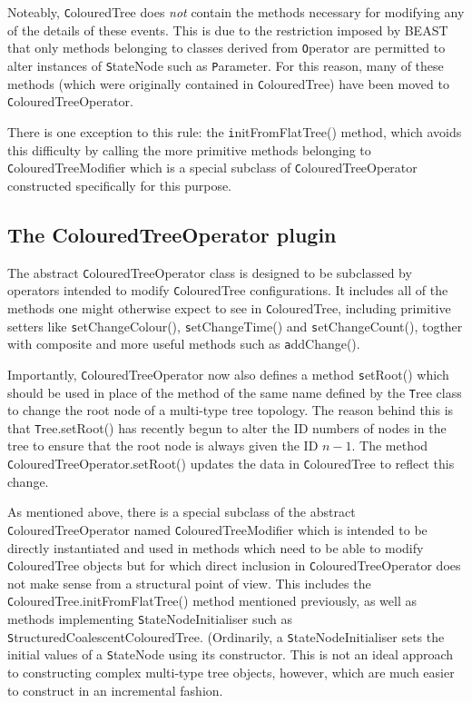 \documentclass[a4paper,11pt]{article}
\newcommand{\class}[1]{{\texttt #1}}
\newcommand{\method}[1]{{\texttt #1}}
\begin{document}
Noteably, \class{ColouredTree} does \emph{not} contain the methods
necessary for modifying any of the details of these events.  This is
due to the restriction imposed by BEAST that only methods belonging to
classes derived from \class{Operator} are permitted to alter instances
of \class{StateNode} such as \class{Parameter}.  For this reason,
many of these methods (which were originally contained in
\class{ColouredTree}) have been moved to \class{ColouredTreeOperator}.

There is one exception to this rule: the \method{initFromFlatTree()}
method, which avoids this difficulty by calling the more primitive
methods belonging to \class{ColouredTreeModifier} which is a special
subclass of \class{ColouredTreeOperator} constructed specifically for
this purpose.

\subsection{The ColouredTreeOperator plugin}

The abstract \class{ColouredTreeOperator} class is designed to be
subclassed by operators intended to modify \class{ColouredTree}
configurations.  It includes all of the methods one might otherwise
expect to see in \class{ColouredTree}, including primitive setters
like \method{setChangeColour()}, \method{setChangeTime()} and
\method{setChangeCount()}, togther with composite and more useful
methods such as \method{addChange()}.

Importantly, \class{ColouredTreeOperator} now also defines a method
\method{setRoot()} which should be used in place of the method of the
same name defined by the \class{Tree} class to change the root node of
a multi-type tree topology.  The reason behind this is that
\class{Tree.setRoot()} has recently begun to alter the ID numbers of
nodes in the tree to ensure that the root node is always given the ID
$n-1$.  The method \class{ColouredTreeOperator.setRoot()} updates the
data in \class{ColouredTree} to reflect this change.

As mentioned above, there is a special subclass of the abstract
\class{ColouredTreeOperator} named \class{ColouredTreeModifier} which
is intended to be directly instantiated and used in methods which need
to be able to modify \class{ColouredTree} objects but for which direct
inclusion in \class{ColouredTreeOperator} does not make sense from a
structural point of view.  This includes the
\class{ColouredTree.initFromFlatTree()} method mentioned previously,
as well as methods implementing \class{StateNodeInitialiser} such as
\class{StructuredCoalescentColouredTree}. (Ordinarily, a
\class{StateNodeInitialiser} sets the initial values of a
\class{StateNode} using its constructor.  This is not an ideal
approach to constructing complex multi-type tree objects, however,
which are much easier to construct in an incremental fashion.
\end{document}
